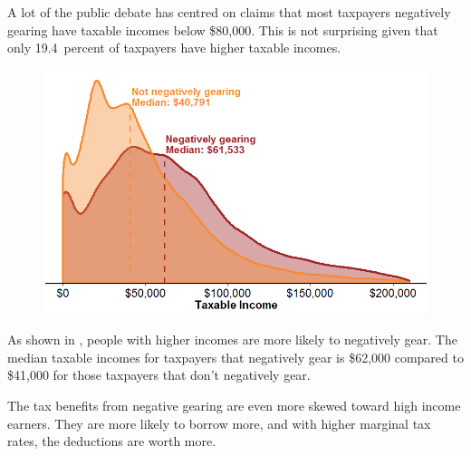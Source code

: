 \documentclass{grattan}\usepackage[]{graphicx}\usepackage[]{color}
\begin{document}
A lot of the public debate has centred on claims that most taxpayers negatively gearing have taxable incomes below \$80,000. This is not surprising given that only 19.4~percent of taxpayers have higher taxable incomes. 

\begin{figure}

\includegraphics[width=\columnwidth]{CGT-NG-atlas//tx-inc-distr-by-NG-1}
\end{figure}


As shown in , people with higher incomes are more likely to negatively gear. The median taxable incomes for taxpayers that negatively gear is \$62,000 compared to  \$41,000 for those taxpayers that don't negatively gear.


The tax benefits from negative gearing are even more skewed toward high income earners. They are more likely to borrow more, and with higher marginal tax rates, the deductions are worth more. 
\end{document}
